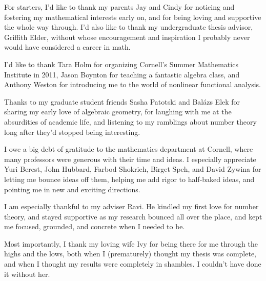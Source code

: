 \documentclass[phd,cornellheadings,tocprelim]{cornell}
\begin{document}
\begin{acknowledgements}
For starters, I'd like to thank my parents Jay and Cindy for noticing and 
fostering my mathematical interests early on, and for being loving and 
supportive the whole way through. I'd also like to thank my undergraduate 
thesis advisor, Griffith Elder, without whose encouragement and inspiration 
I probably never would have considered a career in math. 

I'd like to thank Tara Holm for organizing Cornell's Summer Mathematics 
Institute in 2011, Jason Boynton for teaching a fantastic algebra class, and 
Anthony Weston for introducing me to the world of nonlinear functional 
analysis. 

Thanks to my graduate student friends Sasha Patotski and Bal\'azs Elek for 
sharing my early love of algebraic geometry, for laughing with me at the 
absurdities of academic life, and listening to my ramblings about number 
theory long after they'd stopped being interesting. 

I owe a big debt of gratitude to the mathematics department at Cornell, where 
many professors were generous with their time and ideas. I especially 
appreciate Yuri Berest, John Hubbard, Farbod Shokrieh, Birget Speh, and David 
Zywina for letting me bounce ideas off them, helping me add rigor to 
half-baked ideas, and pointing me in new and exciting directions. 

I am especially thankful to my adviser Ravi. He kindled my first love for 
number theory, and stayed supportive as my research bounced all over the place, 
and kept me focused, grounded, and concrete when I needed to be. 

Most importantly, I thank my loving wife Ivy for being there for me 
through the highs and the lows, both when I (prematurely) thought my thesis was 
complete, and when I thought my results were completely in shambles. I couldn't 
have done it without her. 
\end{acknowledgements}

\contentspage
\normalspacing
\setcounter{page}{1}
\pagestyle{cornell}
\addtolength{\parskip}{0.5\baselineskip}



















\printbibliography[heading=bibintoc]
\end{document}
